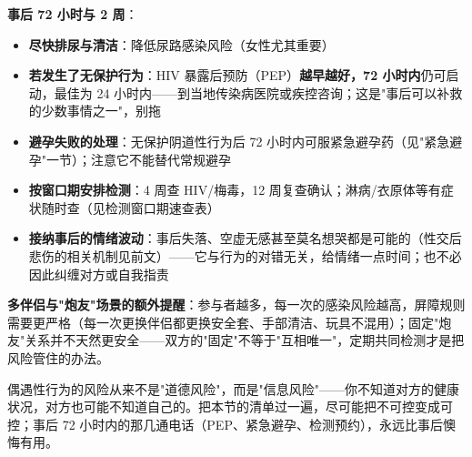 \vspace{0.5em}
\noindent\textbf{事后 72 小时与 2 周}：

\begin{itemize}
	\item \textbf{尽快排尿与清洁}：降低尿路感染风险（女性尤其重要）
	\item \textbf{若发生了无保护行为}：HIV 暴露后预防（PEP）\textbf{越早越好，72 小时内}仍可启动，最佳为 24 小时内——到当地传染病医院或疾控咨询；这是"事后可以补救的少数事情之一"，别拖
	\item \textbf{避孕失败的处理}：无保护阴道性行为后 72 小时内可服紧急避孕药（见"紧急避孕"一节）；注意它不能替代常规避孕
	\item \textbf{按窗口期安排检测}：4 周查 HIV/梅毒，12 周复查确认；淋病/衣原体等有症状随时查（见检测窗口期速查表）
	\item \textbf{接纳事后的情绪波动}：事后失落、空虚无感甚至莫名想哭都是可能的（性交后悲伤的相关机制见前文）——它与行为的对错无关，给情绪一点时间；也不必因此纠缠对方或自我指责
\end{itemize}

\vspace{0.5em}
\noindent\textbf{多伴侣与"炮友"场景的额外提醒}：参与者越多，每一次的感染风险越高，屏障规则需要更严格（每一次更换伴侣都更换安全套、手部清洁、玩具不混用）；固定"炮友"关系并不天然更安全——双方的"固定"不等于"互相唯一"，定期共同检测才是把风险管住的办法。

\begin{tcolorbox}[colback=pink!5!white,colframe=red!50!black,title=贴心小叮咛]
偶遇性行为的风险从来不是"道德风险"，而是"信息风险"——你不知道对方的健康状况，对方也可能不知道自己的。把本节的清单过一遍，尽可能把不可控变成可控；事后 72 小时内的那几通电话（PEP、紧急避孕、检测预约），永远比事后懊悔有用。
\end{tcolorbox}
